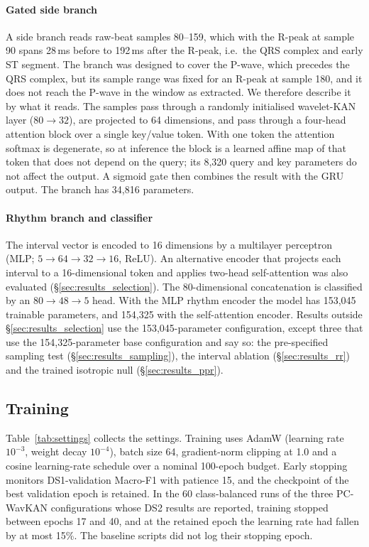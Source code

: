 \documentclass[preprint,12pt]{elsarticle}
\begin{document}
\paragraph{Gated side branch} A side branch reads raw-beat samples 80--159, which with the R-peak at sample 90 spans 28\,ms before to 192\,ms after the R-peak, i.e.\ the QRS complex and early ST segment. The branch was designed to cover the P-wave, which precedes the QRS complex, but its sample range was fixed for an R-peak at sample 180, and it does not reach the P-wave in the window as extracted. We therefore describe it by what it reads. The samples pass through a randomly initialised wavelet-KAN layer ($80\to32$), are projected to 64 dimensions, and pass through a four-head attention block over a single key/value token. With one token the attention softmax is degenerate, so at inference the block is a learned affine map of that token that does not depend on the query; its 8,320 query and key parameters do not affect the output. A sigmoid gate then combines the result with the GRU output. The branch has 34,816 parameters.

\paragraph{Rhythm branch and classifier} The interval vector is encoded to 16 dimensions by a multilayer perceptron (MLP; $5\to64\to32\to16$, ReLU). An alternative encoder that projects each interval to a 16-dimensional token and applies two-head self-attention was also evaluated (\S\ref{sec:results_selection}). The 80-dimensional concatenation is classified by an $80\to48\to5$ head. With the MLP rhythm encoder the model has 153,045 trainable parameters, and 154,325 with the self-attention encoder. Results outside \S\ref{sec:results_selection} use the 153,045-parameter configuration, except three that use the 154,325-parameter base configuration and say so: the pre-specified sampling test (\S\ref{sec:results_sampling}), the interval ablation (\S\ref{sec:results_rr}) and the trained isotropic null (\S\ref{sec:results_ppr}).

\subsection{Training}
\label{sec:training}
Table~\ref{tab:settings} collects the settings. Training uses AdamW (learning rate $10^{-3}$, weight decay $10^{-4}$), batch size 64, gradient-norm clipping at 1.0 and a cosine learning-rate schedule over a nominal 100-epoch budget. Early stopping monitors DS1-validation Macro-F1 with patience 15, and the checkpoint of the best validation epoch is retained. In the 60 class-balanced runs of the three PC-WavKAN configurations whose DS2 results are reported, training stopped between epochs 17 and 40, and at the retained epoch the learning rate had fallen by at most 15\%. The baseline scripts did not log their stopping epoch.
\end{document}

